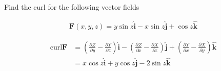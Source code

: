 Find the curl for the following vector fields

\begin{align*}
    \boldsymbol{F}(x, y, z) = y\sin{z} \boldsymbol{\hat{i}} - x\sin{z} \boldsymbol{\hat{j}} + \cos{z} \boldsymbol{\hat{k}}
\end{align*}

\begin{solution}
\begin{align*}
    \mathrm{curl}\boldsymbol{F} &= \left(\frac{\partial Z}{\partial y} - \frac{\partial Y}{\partial z}\right) \boldsymbol{\hat{i}} - \left(\frac{\partial Z}{\partial x} - \frac{\partial X}{\partial z}\right) \boldsymbol{\hat{j}} + \left(\frac{\partial Y}{\partial x} - \frac{\partial X}{\partial y}\right) \boldsymbol{\hat{k}} \\
    &= x\cos{z} \boldsymbol{\hat{i}} + y\cos{z} \boldsymbol{\hat{j}} -2\sin{z} \boldsymbol{\hat{k}}
\end{align*}
\end{solution}